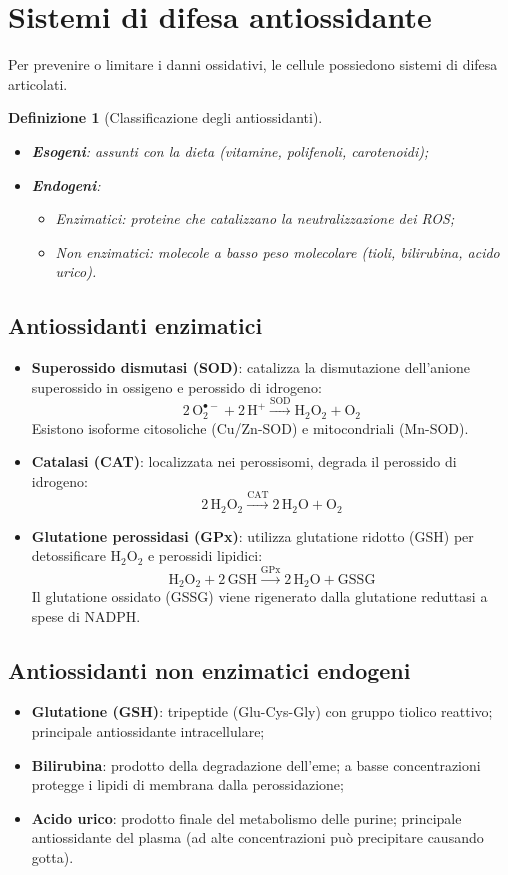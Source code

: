 \documentclass[12pt,a4paper]{report}
\newtheorem{definizione}{Definizione}[section]
\begin{document}
\section{Sistemi di difesa antiossidante}
Per prevenire o limitare i danni ossidativi, le cellule possiedono sistemi di difesa articolati.

\begin{definizione}[Classificazione degli antiossidanti]
\begin{itemize}
\item \textbf{Esogeni}: assunti con la dieta (vitamine, polifenoli, carotenoidi);
\item \textbf{Endogeni}:
\begin{itemize}
\item \textit{Enzimatici}: proteine che catalizzano la neutralizzazione dei ROS;
\item \textit{Non enzimatici}: molecole a basso peso molecolare (tioli, bilirubina, acido urico).
\end{itemize}
\end{itemize}
\end{definizione}

\subsection{Antiossidanti enzimatici}
\begin{itemize}
\item \textbf{Superossido dismutasi (SOD)}: catalizza la dismutazione dell'anione superossido in ossigeno e perossido di idrogeno:
\[
\mathrm{2\,O_2^{\bullet-} + 2\,H^+ \xrightarrow{SOD} H_2O_2 + O_2}
\]
Esistono isoforme citosoliche (Cu/Zn-SOD) e mitocondriali (Mn-SOD).
\item \textbf{Catalasi (CAT)}: localizzata nei perossisomi, degrada il perossido di idrogeno:
\[
\mathrm{2\,H_2O_2 \xrightarrow{CAT} 2\,H_2O + O_2}
\]
\item \textbf{Glutatione perossidasi (GPx)}: utilizza glutatione ridotto (GSH) per detossificare \(\mathrm{H_2O_2}\) e perossidi lipidici:
\[
\mathrm{H_2O_2 + 2\,GSH \xrightarrow{GPx} 2\,H_2O + GSSG}
\]
Il glutatione ossidato (GSSG) viene rigenerato dalla glutatione reduttasi a spese di NADPH.
\end{itemize}

\subsection{Antiossidanti non enzimatici endogeni}
\begin{itemize}
\item \textbf{Glutatione (GSH)}: tripeptide (Glu-Cys-Gly) con gruppo tiolico reattivo; principale antiossidante intracellulare;
\item \textbf{Bilirubina}: prodotto della degradazione dell'eme; a basse concentrazioni protegge i lipidi di membrana dalla perossidazione;
\item \textbf{Acido urico}: prodotto finale del metabolismo delle purine; principale antiossidante del plasma (ad alte concentrazioni può precipitare causando gotta).
\end{itemize}
\end{document}

